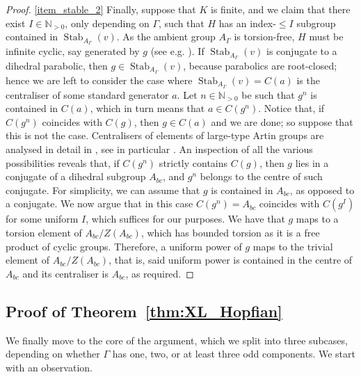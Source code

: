 \documentclass[svgnames]{amsart}
\theoremstyle{plain}
\theoremstyle{definition}
\newcommand{\Stab}[2]{\operatorname{Stab}_{#1}(#2)}
\begin{document}
\begin{proof}
\par\medskip
\eqref{item_stable_2} Finally, suppose that $K$ is finite, and we claim that there exist $I\in\mathbb{N}_{>0}$, only depending on $\Gamma$, such that $H$ has an index-$\leq I$ subgroup contained in $\Stab{A_\Gamma}{v}$. As the ambient group $A_\Gamma$ is torsion-free, $H$ must be infinite cyclic, say generated by $g$ (see e.g. \cite[Lemma 3.2]{Macpherson_virtcyclic}). If $\Stab{A_\Gamma}{v}$ is conjugate to a dihedral parabolic, then $g\in \Stab{A_\Gamma}{v}$, because parabolics are root-closed; hence we are left to consider the case where $\Stab{A_\Gamma}{v}=C(a)$ is the centraliser of some standard generator $a$. Let $n\in\mathbb{N}_{>0}$ be such that $g^n$ is contained in $C(a)$, which in turn means that $a\in C(g^n)$. Notice that, if $C(g^n)$ coincides with $C(g)$, then $g\in C(a)$ and we are done; so suppose that this is not the case. Centralisers of elements of large-type Artin groups are analysed in detail in \cite[Section 3]{MV:centralisers}, see in particular \cite[Remark 3.6]{MV:centralisers}. An inspection of all the various possibilities reveals that, if $C(g^n)$ strictly contains $C(g)$, then $g$ lies in a conjugate of a dihedral subgroup $A_{bc}$, and $g^n$ belongs to the centre of such conjugate. For simplicity, we can assume that $g$ is contained in $A_{bc}$, as opposed to a conjugate. We now argue that in this case $C(g^n)=A_{bc}$ coincides with $C(g^I)$ for some uniform $I$, which suffices for our purposes.  We have that $g$ maps to a torsion element of $A_{bc}/Z(A_{bc})$, which has bounded torsion as it is a free product of cyclic groups. Therefore, a uniform power of $g$ maps to the trivial element of $A_{bc}/Z(A_{bc})$, that is, said uniform power is contained in the centre of $A_{bc}$ and its centraliser is $A_{bc}$, as required.
\end{proof}

\subsection{Proof of Theorem~\ref{thm:XL_Hopfian}}
We finally move to the core of the argument, which we split into three subcases, depending on whether $\Gamma$ has one, two, or at least three odd components. We start with an observation.
\end{document}

